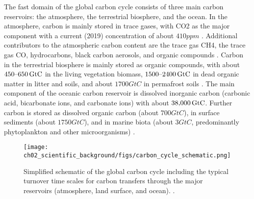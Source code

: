 The fast domain of the global carbon cycle consists of three main carbon
reservoirs: the atmosphere, the terrestrial biosphere, and the ocean. In the
atmosphere, carbon is mainly stored in trace gases, with \ac{CO2} as the major
component with a current (2019) concentration of about $410 \unit{ppm}$
\autocite{Friedlingstein2020}. Additional contributors to the atmospheric
carbon content are the trace gas \ac{CH4}, the trace gas \ac{CO}, hydrocarbons,
black carbon aerosols, and organic compounds \autocite{Ciais2013}. Carbon in
the terrestrial biosphere is mainly stored as organic compounds, with about
$\rangeunit{450}{650}{GtC}$ in the living vegetation biomass,
$\rangeunit{1500}{2400}{GtC}$ in dead organic matter in litter and soils, and
about $1700 \unit{GtC}$ in permafrost soils \autocite{Ciais2013}. The main
component of the oceanic carbon reservoir is dissolved inorganic carbon
(carbonic acid, bicarbonate ions, and carbonate ions) with about
$\mathtxt{38,000} \unit{GtC}$. Further carbon is stored as dissolved organic
carbon (about $700 \unit{GtC}$), in surface sediments (about $1750
\unit{GtC}$), and in marine biota (about $3 \unit{GtC}$, predominantly
phytoplankton and other microorganisms) \autocite{Ciais2013,
  Friedlingstein2020}.

\begin{figure}[t]
  \centering
  \texttt{[image: 
    ch02\_scientific\_background/figs/carbon\_cycle\_schematic.png]}
  \caption[
    Simplified schematic of the global carbon cycle.
  ]{
    Simplified schematic of the global carbon cycle including the typical
    turnover time scales for carbon transfers through the major reservoirs
    (atmosphere, land surface, and ocean). .
  }
  \label{fig:02:carbon_cycle_schematic}
\end{figure}

